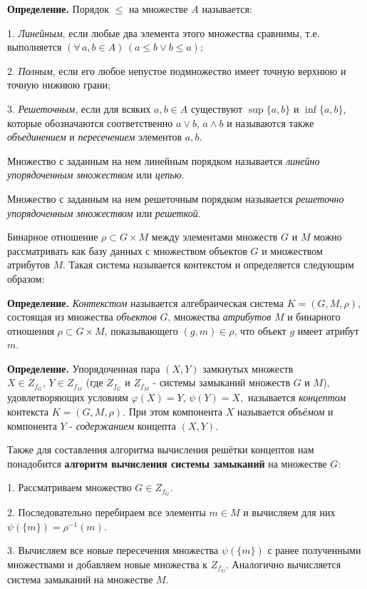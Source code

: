 \documentclass[spec, och, otchet, hidelinks]{SCWorks}
\begin{document}
\par \textbf{Определение.} Порядок $ \leq $ на множестве $ A $ называется:
\par 1. \textit{Линейным}, если любые два элемента этого множества сравнимы, т.е. выполняется 
$ (\forall \, a, b \in A)\,(a\leq b \vee b\leq a) $;
\par 2. \textit{Полным}, если его любое непустое подмножество имеет
точную верхнюю и точную нижнюю грани;
\par 3. \textit{Решеточным}, если для всяких $ a,b \in A $ существуют $ \sup\{a,b\} $ и 
$ \inf\{a,b\} $, которые обозначаются соответственно $ a \vee b, \, a \wedge b $ и называются 
также \textit{объединением} и \textit{пересечением} элементов $ a, b $.
\par Множество с заданным на нем линейным порядком называется \textit{линейно упорядоченным 
множеством} или \textit{цепью}.
\par Множество с заданным на нем решеточным порядком называется \textit{решеточно упорядоченным 
множеством} или \textit{решеткой}. \\

\par Бинарное отношение $ \rho \subset G \times M $ между элементами множеств $ G $ и $ M $ можно 
рассматривать как базу данных с множеством объектов $ G $ и множеством атрибутов $ M $. Такая 
система называется контекстом и определяется следующим образом:
\par \textbf{Определение.} \textit{Контекстом} называется алгебраическая система $ K = (G, M, \rho) $,
состоящая из множества \textit{объектов} $ G $, множества \textit{атрибутов} $ M $ и бинарного 
отношения $ \rho \subset G \times M $, показывающего $ (g, m) \in \rho $, что объект $ g $ имеет
атрибут $ m $. \\

\par \textbf{Определение.} Упорядоченная пара $ (X, Y) $ замкнутых множеств $ X \in Z_{f_G}, \,
Y \in Z_{f_M} $ (где $ Z_{f_G} $ и $ Z_{f_M} $ - системы замыканий множеств $ G $ и $ M $),
удовлетворяющих условиям $ \varphi(X) = Y, \, \psi(Y) = X, $ называется \textit{концептом}
контекста $ K = (G, M, \rho) $. При этом компонента $ X $ называется \textit{объёмом} и 
компонента $ Y $ - \textit{содержанием} концепта $ (X, Y) $. 

\newpage

Также для составления алгоритма вычисления решётки концептов нам понадобится \textbf{алгоритм
вычисления системы замыканий} на множестве $ G $:
\par 1. Рассматриваем множество $ G \in Z_{f_G} $.
\par 2. Последовательно перебираем все элементы $ m \in M $ и вычисляем для них $ \psi(\{m\}) = 
\rho^{-1}(m) $.
\par 3. Вычисляем все новые пересечения множества $ \psi(\{m\}) $ с ранее полученными множествами
и добавляем новые множества к $ Z_{f_G} $. Аналогично вычисляется система замыканий на множестве 
$ M $.
\end{document}
